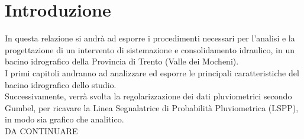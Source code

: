 \section{Introduzione}
In questa relazione si andrà ad esporre i procedimenti necessari per l'analisi e la progettazione di un intervento di sistemazione e consolidamento idraulico, in un bacino idrografico della Provincia di Trento (Valle dei Mocheni).\\
I primi capitoli andranno ad analizzare ed esporre le principali caratteristiche del bacino idrografico dello studio.\\
Successivamente, verrà svolta la regolarizzazione dei dati pluviometrici secondo Gumbel, per ricavare la Linea Segnalatrice di Probabilità Pluviometrica (LSPP), in modo sia grafico che analitico.\\ 
DA CONTINUARE 